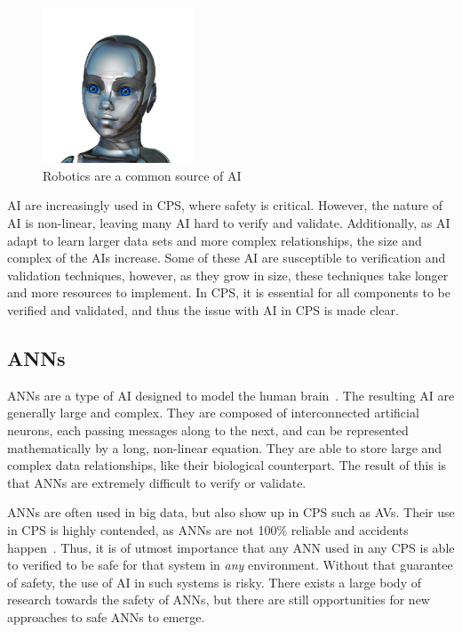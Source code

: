 \begin{figure}[H]
	\centering
	\includegraphics[width=0.4\textwidth]{Content/fig/ai-girl.png}
	\caption{Robotics are a common source of \ac{AI}~\cite{robotgirl-pic} \label{fig:ai-girl}}
\end{figure}

\ac{AI} are increasingly used in \ac{CPS}, where safety is critical.
However, the nature of \ac{AI} is non-linear, leaving many \ac{AI} hard to verify and validate.
Additionally, as \ac{AI} adapt to learn larger data sets and more complex relationships, the size and complex of the \acp{AI} increase.
Some of these \ac{AI} are susceptible to verification and validation techniques, however, as they grow in size, these techniques take longer and more resources to implement.
In \ac{CPS}, it is essential for all components to be verified and validated, and thus the issue with \ac{AI} in \ac{CPS} is made clear.

\subsection{\acfp{ANN}}
\acp{ANN} are a type of \ac{AI} designed to model the human brain~\cite{kohonen1988introduction}.
The resulting \ac{AI} are generally large and complex.
They are composed of interconnected artificial neurons, each passing messages along to the next, and can be represented mathematically by a long, non-linear equation.
They are able to store large and complex data relationships, like their biological counterpart.
The result of this is that \acp{ANN} are extremely difficult to verify or validate.

\acp{ANN} are often used in big data, but also show up in \ac{CPS} such as \acfp{AV}.
Their use in \ac{CPS} is highly contended, as \acp{ANN} are not 100\% reliable and accidents happen~\cite{coldewey_2018}.
Thus, it is of utmost importance that any \ac{ANN} used in any \ac{CPS} is able to verified to be safe for that system in \textit{any} environment.
Without that guarantee of safety, the use of \ac{AI} in such systems is risky.
There exists a large body of research towards the safety of \acp{ANN}, but there are still opportunities for new approaches to safe \acp{ANN} to emerge.

